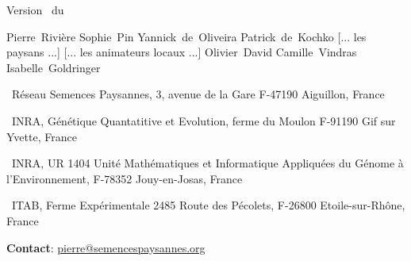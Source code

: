 


\graphicspath{{../ressources/figures/}}




%
%
%
%
%
%
%



\pagestyle{empty}

\begin{center}


\vfill

\large
Version \versionCF~du \dateversionCF

\vfill

\normalsize

Pierre~Rivière \hspace{.5cm}
Sophie~Pin \hspace{.5cm}
Yannick~de~Oliveira \hspace{.5cm}
Patrick~de~Kochko \hspace{.5cm}
[... les paysans ...] \hspace{.5cm}
[... les animateurs locaux ...] \hspace{.5cm}
Olivier~David \hspace{.5cm}
Camille~Vindras \hspace{.5cm}
Isabelle~Goldringer \\
\end{center}

\small
\noindent{}~Réseau Semences Paysannes, 3, avenue de la Gare F-47190 Aiguillon, France 

\noindent{}~INRA, Génétique Quantatitive et Evolution, ferme du Moulon F-91190 Gif sur Yvette, France

\noindent{}~INRA, UR 1404 Unité Mathématiques et Informatique Appliquées du Génome à l'Environnement, F-78352 Jouy-en-Josas, France

\noindent{}~ITAB, Ferme Expérimentale 2485 Route des Pécolets, F-26800 Etoile-sur-Rhône, France

\noindent\up{*} \textbf{Contact}: \href{mailto:pierre@semencespaysannes.org}{\textcolor{mln-green} {pierre@semencespaysannes.org}}

